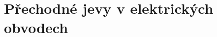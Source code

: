 \documentclass[a4paper, oneside, 11pt]{book}
\begin{document}


\newpage
\textbf{ }

\newpage
\textbf{ }

\renewcommand\thepage{}
\tableofcontents

\newpage
\textbf{ }

\renewcommand\thepage{\arabic{page}}
\setcounter{page}{1}



\chapter{Přechodné jevy v elektrických obvodech}






%
%

%
%
%
%
%


%


\appendix

% 
\end{document}
